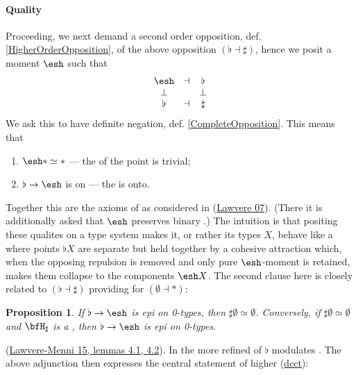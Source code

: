 \documentclass[12pt,titlepage]{article}
\newcommand{\itexarray}[1]{\begin{matrix}#1\end{matrix}}
\theoremstyle{plain}
\newtheorem{prop}{Proposition}
\theoremstyle{definition}
\theoremstyle{remark}
\begin{document}
\hypertarget{quality}{}\paragraph*{{Quality}}\label{quality}
Proceeding, we next demand a second order opposition, def. \ref{HigherOrderOpposition}, of the above opposition $(\flat \dashv \sharp)$, hence we posit a moment $\esh $ such that
\begin{displaymath}
\itexarray{
\esh  &\dashv& \flat
\\
\bot && \bot
\\
\flat &\dashv& \sharp
}
\end{displaymath}
We ask this to have definite negation, def. \ref{CompleteOpposition}. This means that
\begin{enumerate}%
\item $\esh  \ast \simeq \ast$ --- the  of the point is trivial;
\item $\flat \to \esh $ is  on  --- the  is onto.
\end{enumerate}
Together this are the axioms of  as considered in (\hyperlink{Lawvere07}{Lawvere 07}). (There it is additionally asked that $\esh $ preserves binary .)
The intuition is that positing these qualites on a type system makes it, or rather its types $X$, behave like a   where points $\flat X$ are separate but held together by a cohesive attraction which, when the opposing repulsion is removed and only pure $\esh $-moment is retained, makes them collapse to the components $\esh  X$.
The second clause here is closely related to $(\flat \dashv \sharp)$ providing  for $(\emptyset \dashv \ast)$:
\begin{prop}
\label{}\hypertarget{}{}
If $\flat \to \esh $ is epi on 0-types, then $\sharp \emptyset \simeq \emptyset$. Conversely, if $\sharp \emptyset \simeq \emptyset$ and $\bfH_{\sharp}$ is a , then $\flat \to \esh $ is epi on 0-types.
\end{prop}
(\href{http://ncatlab.org/nlab/show/points-to-pieces%20transform#LawvereMenni15}{Lawvere-Menni 15, lemmas 4.1, 4.2}).
In the more refined  of  $\flat$ modulates . The above adjunction then expresses the central statement of higher  (\hyperlink{dcct}{dcct}):
\end{document}
